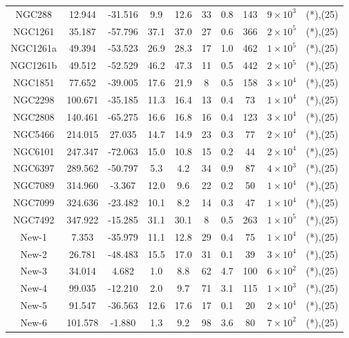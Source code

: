 \begin{table}
\begin{tabular}{cSSSScSccc}
NGC288 & 12.944 & -31.516 & 9.9 & 12.6 & 33 & 0.8 & 143 & $9 \times 10^{3}$ & (*),(25) \\
NGC1261 & 35.187 & -57.796 & 37.1 & 37.0 & 27 & 0.6 & 366 & $2 \times 10^{5}$ & (*),(25) \\
NGC1261a & 49.394 & -53.523 & 26.9 & 28.3 & 17 & 1.0 & 462 & $1 \times 10^{5}$ & (*),(25) \\
NGC1261b & 49.512 & -52.529 & 46.2 & 47.3 & 11 & 0.5 & 442 & $2 \times 10^{5}$ & (*),(25) \\
NGC1851 & 77.652 & -39.005 & 17.6 & 21.9 & 8 & 0.5 & 158 & $3 \times 10^{4}$ & (*),(25) \\
NGC2298 & 100.671 & -35.185 & 11.3 & 16.4 & 13 & 0.4 & 73 & $1 \times 10^{4}$ & (*),(25) \\
NGC2808 & 140.461 & -65.275 & 16.6 & 16.8 & 16 & 0.4 & 123 & $3 \times 10^{4}$ & (*),(25) \\
NGC5466 & 214.015 & 27.035 & 14.7 & 14.9 & 23 & 0.3 & 77 & $2 \times 10^{4}$ & (*),(25) \\
NGC6101 & 247.347 & -72.063 & 15.0 & 10.8 & 15 & 0.2 & 44 & $2 \times 10^{4}$ & (*),(25) \\
NGC6397 & 289.562 & -50.797 & 5.3 & 4.2 & 34 & 0.9 & 87 & $4 \times 10^{3}$ & (*),(25) \\
NGC7089 & 314.960 & -3.367 & 12.0 & 9.6 & 22 & 0.2 & 50 & $1 \times 10^{4}$ & (*),(25) \\
NGC7099 & 324.636 & -23.482 & 10.1 & 8.2 & 14 & 0.3 & 47 & $1 \times 10^{4}$ & (*),(25) \\
NGC7492 & 347.922 & -15.285 & 31.1 & 30.1 & 8 & 0.5 & 263 & $1 \times 10^{5}$ & (*),(25) \\
New-1 & 7.353 & -35.979 & 11.1 & 12.8 & 29 & 0.4 & 75 & $1 \times 10^{4}$ & (*),(25) \\
New-2 & 26.781 & -48.483 & 15.5 & 17.0 & 31 & 0.1 & 39 & $3 \times 10^{4}$ & (*),(25) \\
New-3 & 34.014 & 4.682 & 1.0 & 8.8 & 62 & 4.7 & 100 & $6 \times 10^{2}$ & (*),(25) \\
New-4 & 99.035 & -12.210 & 2.0 & 9.7 & 71 & 3.1 & 115 & $1 \times 10^{3}$ & (*),(25) \\
New-5 & 91.547 & -36.563 & 12.6 & 17.6 & 17 & 0.1 & 20 & $2 \times 10^{4}$ & (*),(25) \\
New-6 & 101.578 & -1.880 & 1.3 & 9.2 & 98 & 3.6 & 80 & $7 \times 10^{2}$ & (*),(25) \\
\hline \hline
\end{tabular}
\end{table}
